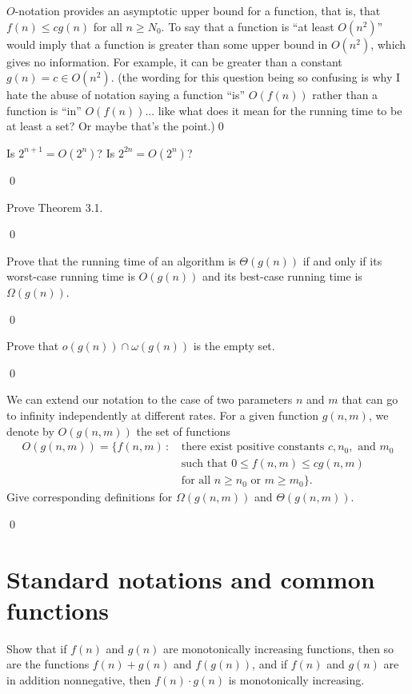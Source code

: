 \sol $O$-notation provides an asymptotic upper bound for a function, that is, that $f(n) \leq cg(n)$ for all $n \geq N_0$. To say that a function is ``at least $O(n^2)$'' would imply that a function is greater than some upper bound in $O(n^2)$, which gives no information. For example, it can be greater than a constant $g(n) = c \in O(n^2)$. (the wording for this question being so confusing is why I hate the abuse of notation saying a function ``is'' $O(f(n))$ rather than a function is ``in'' $O(f(n))$... like what does it mean for the running time to be at least a set? Or maybe that's the point.)\qed

 Is $2^{n+1} = O(2^n)$? Is $2^{2n} = O(2^n)$?

\sol \qed

 Prove Theorem 3.1.

\pf \qed

 Prove that the running time of an algorithm is $\Theta(g(n))$ if and only if its worst-case running time is $O(g(n))$ and its best-case running time is $\Omega(g(n))$.

\pf \qed

 Prove that $o(g(n)) \cap \omega(g(n))$ is the empty set.

\pf \qed

 We can extend our notation to the case of two parameters $n$ and $m$ that can go to infinity independently at different rates. For a given function $g(n,m)$, we denote by $O(g(n,m))$ the set of functions
\begin{align*}
    O(g(n,m)) = \{f(n,m) \,  : \, & \text{there exist positive constants } c, n_0, \text{ and } m_0 \\
    & \text{such that } 0 \leq f(n,m) \leq cg(n,m) \\
    & \text{for all }n \geq n_0 \text{ or } m \geq m_0\}.
\end{align*}
Give corresponding definitions for $\Omega(g(n,m))$ and $\Theta(g(n,m))$.

\sol \qed

\section{Standard notations and common functions}

 Show that if $f(n)$ and $g(n)$ are monotonically increasing functions, then so are the functions $f(n) + g(n)$ and $f(g(n))$, and if $f(n)$ and $g(n)$ are in addition nonnegative, then $f(n) \cdot g(n)$ is monotonically increasing.

